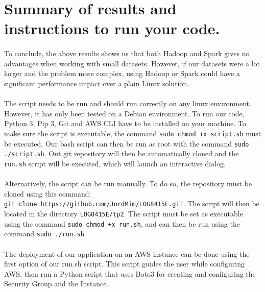 \section{Summary of results and instructions to run your code.} \label{T7}

\paragraph{}To conclude, the above results shows us that both Hadoop and Spark gives no advantages when working with small datasets. However, if our datasets were a lot larger and the problem more complex, using Hadoop or Spark could have a significant performance impact over a plain Linux solution.

\paragraph{}The script needs to be run and should run correctly on any linux environment. However, it has only been tested on a Debian environment. To run our code, Python 3, Pip 3, Git and AWS CLI have to be installed on your machine. To make sure the script is executable, the command \verb|sudo chmod +x script.sh| must be executed. Our bash script can then be run as root with the command \verb|sudo ./script.sh|. Out git repository will then be automatically cloned and the \verb|run.sh| script will be executed, which will launch an interactive dialog.

\paragraph{}Alternatively, the script can be run manually. To do so, the repository must be cloned using this command:\\\verb|git clone https://github.com/JordMim/LOG8415E.git|. The script will then be located in the directory \verb|LOG8415E/tp2|. The script must be set as executable using the command \verb|sudo chmod +x run.sh|, and can then be run using the command \verb|sudo ./run.sh|.

\paragraph{}The deployment of our application on an AWS instance can be done using the first option of our run.sh script. This script guides the user while configuring AWS, then run a Python script that uses Boto3 for creating and configuring the Security Group and the Instance.

